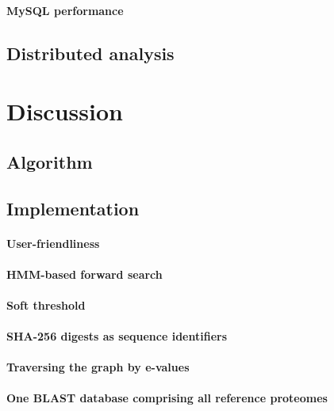 \documentclass[a4paper,12pt]{scrreprt}
\begin{document}
			\subsubsection{MySQL performance}
				
	\section{Distributed analysis}
		

\chapter{Discussion}
	
	\section{Algorithm}
		
	\section{Implementation}
		
		\subsubsection{User-friendliness}
			
		\subsubsection{HMM-based forward search}
			
		\subsubsection{Soft threshold}
			
		\subsubsection{SHA-256 digests as sequence identifiers}
			
		\subsubsection{Traversing the graph by e-values}
			
		\subsubsection{One BLAST database comprising all reference proteomes}
			
\end{document}
